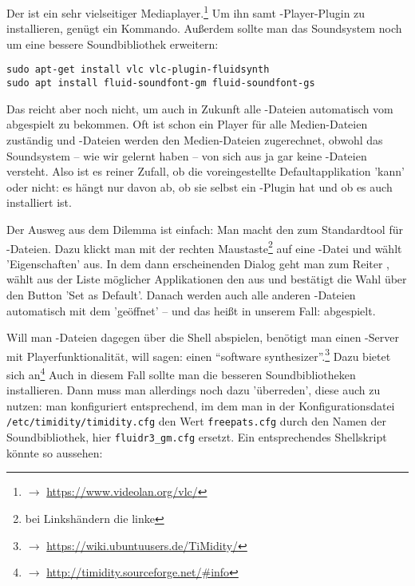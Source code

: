 Der  ist ein sehr vielseitiger Mediaplayer.\footnote{$\rightarrow$
\href{https://www.videolan.org/vlc/}{https://www.videolan.org/vlc/}} Um ihn samt
-Player-Plugin zu installieren, genügt ein Kommando. Außerdem sollte
man das Soundsystem noch um eine bessere Soundbibliothek erweitern:

\begin{verbatim}
sudo apt-get install vlc vlc-plugin-fluidsynth
sudo apt install fluid-soundfont-gm fluid-soundfont-gs
\end{verbatim}

Das reicht aber noch nicht, um auch in Zukunft alle -Dateien automatisch vom  abgespielt zu bekommen. Oft ist schon ein Player für alle Medien-Dateien zuständig und -Dateien werden den Medien-Dateien zugerechnet, obwohl das Soundsystem -- wie wir gelernt haben -- von sich aus ja gar keine -Dateien versteht. Also ist es reiner Zufall, ob die voreingestellte Defaultapplikation  'kann' oder nicht: es hängt nur davon ab, ob sie selbst ein -Plugin hat und ob es auch installiert ist.

Der Ausweg aus dem Dilemma ist einfach: Man macht den  zum Standardtool für -Dateien. Dazu klickt man mit der rechten Maustaste\footnote{bei Linkshändern die linke} auf eine -Datei und wählt 'Eigenschaften' aus. In dem dann erscheinenden Dialog geht man zum Reiter , wählt aus der Liste möglicher Applikationen den  aus und bestätigt die Wahl über den Button 'Set as Default'. Danach werden auch alle anderen -Dateien automatisch mit dem   'geöffnet' -- und das heißt in unserem Fall: abgespielt.

Will man -Dateien dagegen über die Shell abspielen, benötigt man einen
-Server mit Playerfunktionalität, will sagen: einen \enquote{software
synthesizer}.\footnote{$\rightarrow$
\href{https://wiki.ubuntuusers.de/TiMidity/}{https://wiki.ubuntuusers.de/TiMidity/}}
Dazu bietet sich  an\footnote{$\rightarrow$
\href{http://timidity.sourceforge.net/{\#}info}{http://timidity.sourceforge.net/{\#}info}}
Auch in diesem Fall sollte man die besseren Soundbibliotheken installieren. Dann
muss man  allerdings noch dazu 'überreden', diese auch zu nutzen:
man konfiguriert  entsprechend, im dem man in der
Konfigurationsdatei \texttt{/etc/timidity/timidity.cfg} den Wert
\texttt{freepats.cfg} durch den Namen der Soundbibliothek, hier
\texttt{fluidr3\_gm.cfg} ersetzt. Ein entsprechendes Shellskript könnte so
aussehen:


